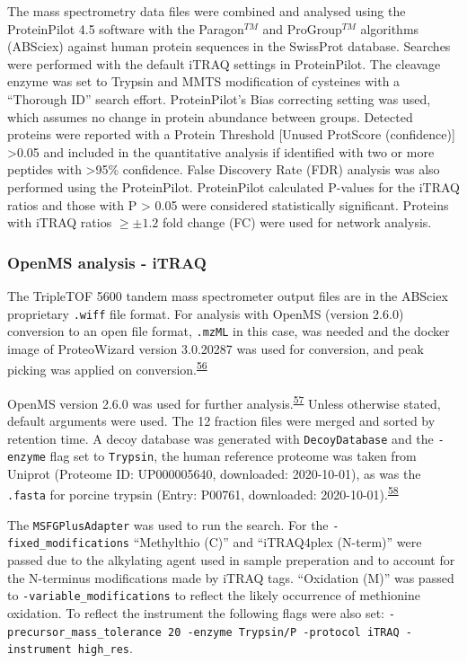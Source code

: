\documentclass[
]{article}
\begin{document}
The mass spectrometry data files were combined and analysed using the ProteinPilot 4.5 software with the Paragon\(^{TM}\) and ProGroup\(^{TM}\) algorithms (ABSciex) against human protein sequences in the SwissProt database.
Searches were performed with the default iTRAQ settings in ProteinPilot.
The cleavage enzyme was set to Trypsin and MMTS modification of cysteines with a ``Thorough ID'' search effort.
ProteinPilot's Bias correcting setting was used, which assumes no change in protein abundance between groups.
Detected proteins were reported with a Protein Threshold {[}Unused ProtScore (confidence){]} \textgreater0.05 and included in the quantitative analysis if identified with two or more peptides with \textgreater95\% confidence.
False Discovery Rate (FDR) analysis was also performed using the ProteinPilot.
ProteinPilot calculated P-values for the iTRAQ ratios and those with P \textgreater{} 0.05 were considered statistically significant.
Proteins with iTRAQ ratios \(\ge\pm1.2\) fold change (FC) were used for network analysis.

\hypertarget{openms-chap3}{%
\subsubsection{OpenMS analysis - iTRAQ}\label{openms-chap3}}

The TripleTOF 5600 tandem mass spectrometer output files are in the ABSciex proprietary \texttt{.wiff} file format.
For analysis with OpenMS (version 2.6.0) conversion to an open file format, \texttt{.mzML} in this case, was needed and the docker image of ProteoWizard version 3.0.20287 was used for conversion, and peak picking was applied on conversion.\textsuperscript{\protect\hyperlink{ref-chambers_cross-platform_2012}{56}}

OpenMS version 2.6.0 was used for further analysis.\textsuperscript{\protect\hyperlink{ref-rost_openms_2016}{57}}
Unless otherwise stated, default arguments were used.
The 12 fraction files were merged and sorted by retention time.
A decoy database was generated with \texttt{DecoyDatabase} and the \texttt{-enzyme} flag set to \texttt{Trypsin}, the human reference proteome was taken from Uniprot (Proteome ID: UP000005640, downloaded: 2020-10-01), as was the \texttt{.fasta} for porcine trypsin (Entry: P00761, downloaded: 2020-10-01).\textsuperscript{\protect\hyperlink{ref-the_uniprot_consortium_uniprot_2021}{58}}

The \texttt{MSFGPlusAdapter} was used to run the search.
For the \texttt{-fixed\_modifications} ``Methylthio (C)'' and ``iTRAQ4plex (N-term)'' were passed due to the alkylating agent used in sample preperation and to account for the N-terminus modifications made by iTRAQ tags.
``Oxidation (M)'' was passed to \texttt{-variable\_modifications} to reflect the likely occurrence of methionine oxidation.
To reflect the instrument the following flags were also set: \texttt{-precursor\_mass\_tolerance\ 20\ -enzyme\ Trypsin/P\ -protocol\ iTRAQ\ -instrument\ high\_res}.
\end{document}
